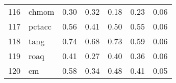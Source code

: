\documentclass[12pt]{article}
\begin{document}
\begin{footnotesize}
\begin{longtable}{rl|c|c|c|c|c}
				116                  & chmom                       & 0.30                             & 0.32                                                                                          & 0.18                                                                                          & 0.23                                                                                          & 0.06                                                                                                   \\
				117                  & pctacc                      & 0.56                             & 0.41                                                                                          & 0.50                                                                                          & 0.55                                                                                          & 0.06                                                                                                   \\
				118                  & tang                        & 0.74                             & 0.68                                                                                          & 0.73                                                                                          & 0.59                                                                                          & 0.06                                                                                                   \\
				119                  & roaq                        & 0.41                             & 0.27                                                                                          & 0.40                                                                                          & 0.36                                                                                          & 0.06                                                                                                   \\
				120                  & em                          & 0.58                             & 0.34                                                                                          & 0.48                                                                                          & 0.41                                                                                          & 0.05                                                                                                   \\

\end{longtable}
\end{footnotesize}
\end{document}
